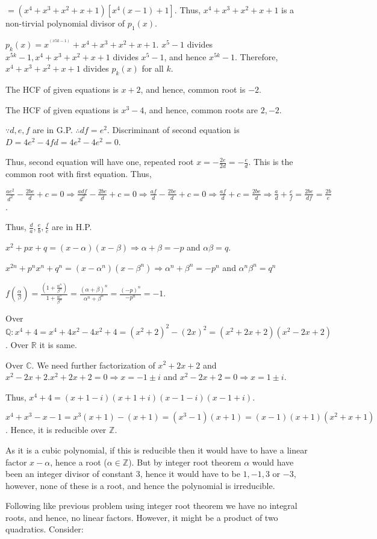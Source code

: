   $= (x^4 + x^3 + x^2 + x + 1)[x^4(x - 1) + 1]$. Thus, $x^4 + x^3 + x^2 + x + 1$ is a non-tirvial polynomial
  divisor of $p_1(x)$.

  $p_k(x) = x^^(x{5k} - 1) + x^4 + x^3 + x^2 + x + 1$. $x^5 - 1$ divides $x^{5k} - 1, x^4 + x^3 + x^2 + x +
  1$ divides $x^5 - 1$, and hence $x^{5k} - 1$. Therefore, $x^4 + x^3 + x^2 + x + 1$ divides $p_k(x)$ for
  all $k$.
\item The HCF of given equations is $x + 2$, and hence, common root is $-2$.
\item The HCF of given equations is $x^3 - 4$, and hence, common roots are $2, -2$.
\item $\because d, e, f$ are in G.P. $\therefore df = e^2$. Discriminant of second equation is $D = 4e^2 -
  4fd = 4e^2 - 4e^2 = 0$.

  Thus, second equation will have one, repeated root $x = -\frac{2e}{2d} = -\frac{e}{d}$. This is the common
  root with first equation. Thus,

  $\frac{ae^2}{d^2} - \frac{2be}{d} + c = 0 \Rightarrow \frac{adf}{d^2} - \frac{2be}{d} + c = 0 \Rightarrow
  \frac{af}{d} - \frac{2be}{d} + c = 0 \Rightarrow \frac{af}{d} + c = \frac{2be}{d} \Rightarrow \frac{a}{d}
  + \frac{c}{f} = \frac{2be}{df} = \frac{2b}{e}$.

  Thus, $\frac{d}{a}, \frac{e}{b}, \frac{f}{c}$ are in H.P.
\item $x^2 + px + q = (x - \alpha)(x - \beta) \Rightarrow \alpha + \beta = -p$ and $\alpha\beta = q$.

  $x^{2n} + p^nx^n + q^n = (x - \alpha^n)(x - \beta^n) \Rightarrow \alpha^n + \beta^n = -p^n$ and
  $\alpha^n\beta^n = q^n$

  $f\left(\frac{\alpha}{\beta}\right) = \frac{\left(1 + \frac{\alpha^n}{\beta^n}\right)}{1 +
  \frac{\alpha^n}{\beta^n}} = \frac{(\alpha + \beta)^n}{\alpha^n + \beta^n} = \frac{(-p)^n}{-p^n} = -1$.
\item Over $\mathbb{Q}: x^4 + 4 = x^4 + 4x^2 - 4x^2 + 4 = (x^2 + 2)^2 - (2x)^2 = (x^2 + 2x + 2)(x^2 - 2x +
  2)$. Over $\mathbb{R}$ it is same.

  Over $\mathbb{C}$. We need further factorization of $x^2 + 2x + 2$ and $x^2 - 2x + 2. x^2 + 2x + 2 = 0
  \Rightarrow x = -1 \pm i$ and $x^2 - 2x + 2 = 0 \Rightarrow x = 1 \pm i$.

  Thus, $x^4 + 4 = (x + 1 - i)(x + 1 + i)(x - 1 - i)(x - 1 + i)$.
\item $x^4 + x^3 - x - 1 = x^3(x + 1) - (x + 1) = (x^3 - 1)(x + 1) = (x - 1)(x + 1)(x^2 + x + 1)$. Hence, it
  is reducible over $\mathbb{Z}$.
\item As it is a cubic polynomial, if this is reducible then it would have to have a linear factor $x -
  \alpha$, hence a root ($\alpha\in\mathbb{Z}$). But by integer root theorem $\alpha$ would have been an
  integer divisor of constant $3$, hence it would have to be $1, -1, 3$ or $-3$, however, none of these is a
  root, and hence the polynomial is irreducible.
\item Following like previous problem using integer root theorem we have no integral roots, and hence, no
  linear factors. However, it might be a product of two quadratics. Consider:

